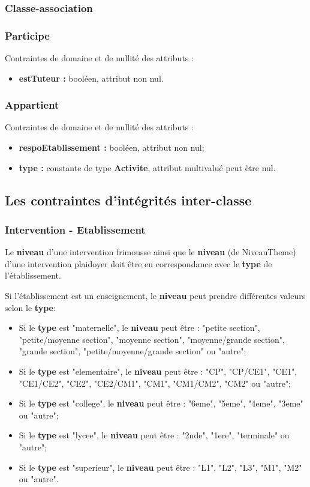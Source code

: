 \subsubsection{Classe-association}

\subsubsection*{Participe}
Contraintes de domaine et de nullité des attributs :
\begin{itemize}
	\item \textbf{estTuteur :} booléen, attribut non nul.\\
\end{itemize}

\subsubsection*{Appartient}
Contraintes de domaine et de nullité des attributs :
\begin{itemize}
	\item \textbf{respoEtablissement :} booléen, attribut non nul;
	\item \textbf{type :} constante de type \textbf{Activite}, attribut multivalué peut être nul.
\end{itemize}


\subsection{Les contraintes d'intégrités inter-classe}


\subsubsection*{Intervention - Etablissement}
Le \textbf{niveau} d'une intervention frimousse ainsi que le \textbf{niveau} (de NiveauTheme) d'une intervention plaidoyer doit être en correspondance avec le \textbf{type} de l'établissement.  

Si l'établissement est un enseignement, le \textbf{niveau} peut prendre différentes valeurs selon le \textbf{type}:
\begin{itemize}
\item Si le \textbf{type} est "maternelle", le \textbf{niveau} peut être : "petite section", "petite/moyenne section", "moyenne section", "moyenne/grande section", "grande section", "petite/moyenne/grande section" ou "autre";
\item Si le \textbf{type} est "elementaire", le \textbf{niveau} peut être : "CP", "CP/CE1", "CE1", "CE1/CE2", "CE2", "CE2/CM1", "CM1", "CM1/CM2", "CM2" ou "autre";
\item Si le \textbf{type} est "college", le \textbf{niveau} peut être : "6eme", "5eme", "4eme", "3eme" ou "autre";
\item Si le \textbf{type} est "lycee", le \textbf{niveau} peut être : "2nde", "1ere", "terminale" ou "autre";
\item Si le \textbf{type} est "superieur", le \textbf{niveau} peut être : "L1", "L2", "L3", "M1", "M2" ou "autre".
\end{itemize}

